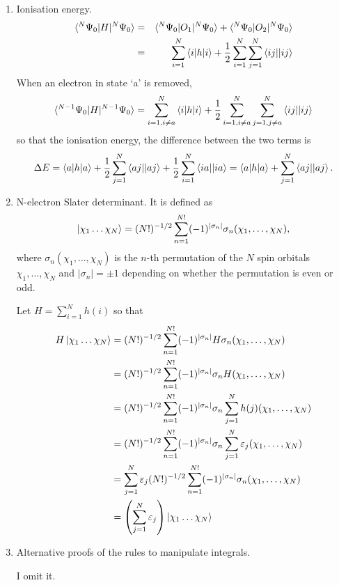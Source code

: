 \begin{enumerate}
\item\label{c2p14} Ionisation energy.
\begin{eqnarray*}
\braket{^N\Psi_0|H|^N\Psi_0} &=& \braket{^N\Psi_0|O_1|^N\Psi_0} + 
\braket{^N\Psi_0|O_2|^N\Psi_0} \\
 &=& \sum_{i=1}^N\braket{i|h|i} + \frac{1}{2}
\sum_{i=1}^N\sum_{j=1}^N\braket{ij||ij}
\end{eqnarray*}
When an electron in state `a' is removed,
\[
\braket{^{N-1}\Psi_0|H|^{N-1}\Psi_0} = \sum_{i=1, i\ne a}^N\braket{i|h|i} + 
\frac{1}{2}\sum_{i=1,i\ne a}^N\sum_{j=1,j\ne a}^N\braket{ij||ij}
\]
so that the ionisation energy, the difference between the two terms is
\[
\Delta E = \braket{a|h|a} + \frac{1}{2}\sum_{j=1}^N\braket{aj||aj} +
\frac{1}{2}\sum_{i=1}^N\braket{ia||ia} = \braket{a|h|a} + \sum_{j=1}^N\braket{
aj||aj}.
\]

\item\label{c2p15} N-electron Slater determinant.
It is defined as 
\[
\ket{\chi_1\ldots\chi_N} = (N!)^{-1/2}\sum_{n=1}^{N!}(-1)^{|\sigma_n|}
\sigma_n(\chi_1, \ldots, \chi_N),
\]
where $\sigma_n(\chi_1, \ldots, \chi_N)$ is the $n$-th permutation of the $N$
spin orbitals $\chi_1, \ldots, \chi_N$ and $|\sigma_n| = \pm 1$ depending on
whether the permutation is even or odd.

Let $H = \sum_{i=1}^N h(i)$ so that
\[
\begin{aligned}
H\ket{\chi_1\ldots\chi_N} &= (N!)^{-1/2}
   \sum_{n=1}^{N!}(-1)^{|\sigma_n|}H\sigma_n(\chi_1, \ldots, \chi_N) \\
 &=(N!)^{-1/2}\sum_{n=1}^{N!}(-1)^{|\sigma_n|}\sigma_nH(\chi_1, \ldots, \chi_N) \\
 &=(N!)^{-1/2}\sum_{n=1}^{N!}(-1)^{|\sigma_n|}\sigma_n\sum_{j=1}^Nh(j)
    (\chi_1, \ldots, \chi_N) \\
 &=(N!)^{-1/2}\sum_{n=1}^{N!}(-1)^{|\sigma_n|}\sigma_n\sum_{j=1}^N\varepsilon_j
    (\chi_1, \ldots, \chi_N) \\
 &=\sum_{j=1}^N\varepsilon_j(N!)^{-1/2}\sum_{n=1}^{N!}(-1)^{|\sigma_n|}\sigma_n
    (\chi_1, \ldots, \chi_N) \\
 &=\left(\sum_{j=1}^N\varepsilon_j\right)\ket{\chi_1\ldots\chi_N}
\end{aligned}
\]

\item Alternative proofs of the rules to manipulate integrals.

I omit it.


\end{enumerate}
